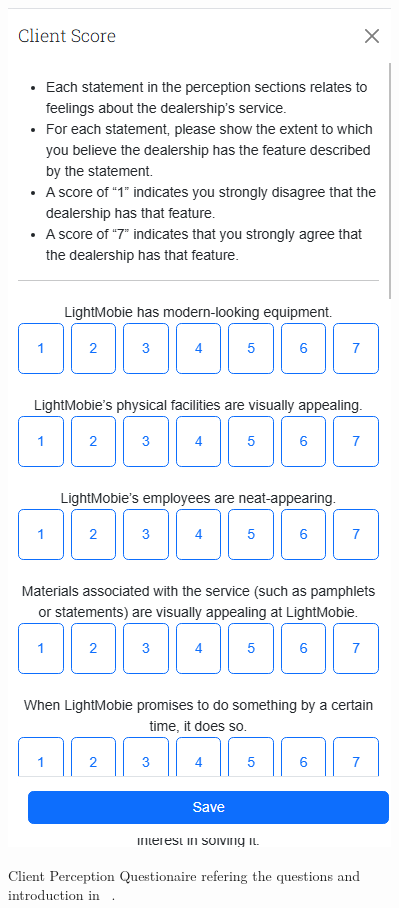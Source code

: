 \begin{figure}[htbp]
  \caption{Client Perception Questionaire refering the questions and introduction in ~\cite{master_servqual_model}.}
  \centering
  \includegraphics[width=\textwidth]{figs/Implementation/client/PerceptionQuestionare}
  \label{fig:PerceptionQuestionare}
\end{figure}


